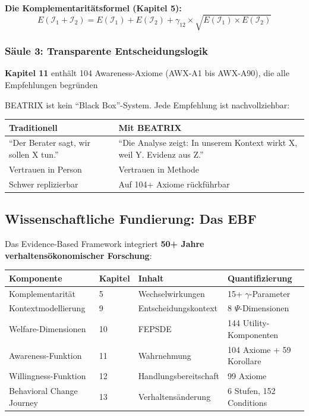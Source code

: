\documentclass[11pt,a4paper]{article}
\begin{document}
\begin{formulabox}
\textbf{Die Komplementaritätsformel (Kapitel 5):}
\begin{equation}
E(\mathcal{I}_1 + \mathcal{I}_2) = E(\mathcal{I}_1) + E(\mathcal{I}_2) + \gamma_{12} \times \sqrt{E(\mathcal{I}_1) \times E(\mathcal{I}_2)}
\end{equation}
\end{formulabox}

\subsubsection{Säule 3: Transparente Entscheidungslogik}

\begin{ebfbox}
\textbf{Kapitel 11} enthält 104 Awareness-Axiome (AWX-A1 bis AWX-A90), die alle Empfehlungen begründen
\end{ebfbox}

BEATRIX ist kein ``Black Box''-System. Jede Empfehlung ist nachvollziehbar:

\begin{center}
\begin{tabular}{p{5.5cm}p{6.5cm}}
\toprule
\textbf{Traditionell} & \textbf{Mit BEATRIX} \\
\midrule
``Der Berater sagt, wir sollen X tun.'' & ``Die Analyse zeigt: In unserem Kontext wirkt X, weil Y. Evidenz aus Z.'' \\
Vertrauen in Person & Vertrauen in Methode \\
Schwer replizierbar & Auf 104+ Axiome rückführbar \\
\bottomrule
\end{tabular}
\end{center}

\subsection{Wissenschaftliche Fundierung: Das EBF}

Das Evidence-Based Framework integriert \textbf{50+ Jahre verhaltensökonomischer Forschung}:

\begin{center}
\begin{tabular}{llll}
\toprule
\textbf{Komponente} & \textbf{Kapitel} & \textbf{Inhalt} & \textbf{Quantifizierung} \\
\midrule
Komplementarität & 5 & Wechselwirkungen & 15+ $\gamma$-Parameter \\
Kontextmodellierung & 9 & Entscheidungskontext & 8 $\Psi$-Dimensionen \\
Welfare-Dimensionen & 10 & FEPSDE & 144 Utility-Komponenten \\
Awareness-Funktion & 11 & Wahrnehmung & 104 Axiome + 59 Korollare \\
Willingness-Funktion & 12 & Handlungsbereitschaft & 99 Axiome \\
Behavioral Change Journey & 13 & Verhaltensänderung & 6 Stufen, 152 Conditions \\
\bottomrule
\end{tabular}
\end{center}
\end{document}
